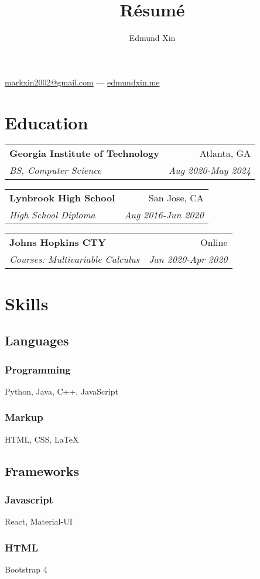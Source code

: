\documentclass[letterpaper,11pt]{article}
\makeatletter
\renewcommand{\maketitle}{
  \begin{center}
  {\huge\bfseries
  \theauthor}

  \vspace{0.25em}

  \href{mailto:markxin2002@gmail.com}{markxin2002@gmail.com} --- \href{https://edmundxin.me}{edmundxin.me}

  \end{center}
}
\newcommand{\resumeSubheading}[4]{
  \vspace{0.25em}
  \begin{tabular*}{0.97\textwidth}[t]{l@{\extracolsep{\fill}}r}
    \textbf{#1} & #2 \\
    \textit{\small#3} & \textit{\small #4} \\
  \end{tabular*}\vspace{0.25em}
}
\makeatother
\begin{document}
\title{R\'esum\'e}
\author{Edmund Xin}

\maketitle

\section{Education}

\resumeSubheading{Georgia Institute of Technology}
{Atlanta, GA}{BS, Computer Science}{Aug 2020-May 2024}


\resumeSubheading{Lynbrook High School}
{San Jose, CA}{High School Diploma}{Aug 2016-Jun 2020}

\resumeSubheading{Johns Hopkins CTY}
{Online}{Courses: Multivariable Calculus}{Jan 2020-Apr 2020}

\section{Skills}

\subsection{Languages}

\subsubsection{Programming}

Python, Java, C++, JavaScript

\subsubsection{Markup}

HTML, CSS, {\LaTeX}

\subsection{Frameworks}

\subsubsection{Javascript}

React, Material-UI

\subsubsection{HTML}
Bootstrap 4
\end{document}
